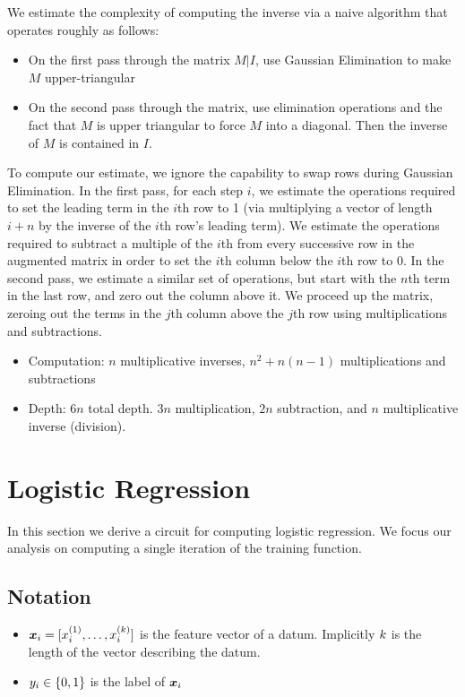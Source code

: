 We estimate the complexity of computing the inverse via a naive algorithm that operates roughly as follows:
\begin{itemize}
	\item On the first pass through the matrix $M | I$, use Gaussian Elimination to make $M$ upper-triangular
	\item On the second pass through the matrix, use elimination operations and the fact that $M$ is upper triangular  to force $M$ into a diagonal. Then the inverse of $M$ is contained in $I$.
\end{itemize}
To compute our estimate, we ignore the capability to swap rows during Gaussian Elimination. In the first pass, for each step $i$, we estimate the operations required to set the leading term in the $i$th row to 1 (via multiplying a vector of length $i+n$ by the inverse of the $i$th row's leading term). We estimate the operations required to subtract a multiple of the $i$th from every successive row in the augmented matrix in order to set the $i$th column below the $i$th row to 0. 
In the second pass, we estimate a similar set of operations, but start with the $n$th term in the last row, and zero out the column above it. We proceed up the matrix, zeroing out the terms in the $j$th column above the $j$th row using multiplications and subtractions.

\begin{itemize}
	\item Computation: $n$ multiplicative inverses, $n^{2}+n(n-1)$ multiplications and subtractions
	\item Depth: $6n$ total depth. $3n$ multiplication, $2n$ subtraction, and $n$ multiplicative inverse (division).
\end{itemize}


\section{Logistic Regression}

In this section we derive a circuit for computing logistic regression.
We focus our analysis on computing a single iteration of the training function.


\subsection{Notation}
\begin{itemize}
	\item $\point{i} = [\datum{i}^{(1)} ,\ldots, \datum{i}^{(\featurelen)}]$ is the feature vector of a datum. Implicitly $k$ is the length of the vector describing the datum.
	\item $y_{i} \in \{ 0,1\}$ is the label of $\point{i}$

\end{itemize}

